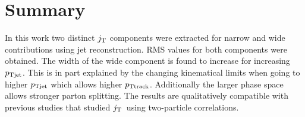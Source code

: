 \pagebreak
\FloatBarrier
\section{Summary}
\label{sec:sum}
In this work two distinct $j_{\rm T}$ components were extracted for narrow and wide contributions using jet reconstruction. RMS values for both components were obtained. The width of the wide component is found to increase for increasing $p_{\rm Tjet}$. This is in part explained by the changing kinematical limits when going to higher $p_{\rm Tjet}$ which allows higher $p_{\rm Ttrack}$. Additionally the larger phase space allows stronger parton splitting. The results are qualitatively compatible with previous studies that studied $j_{\rm T}$ using two-particle correlations.

